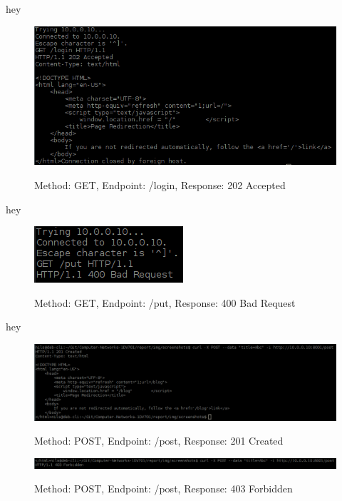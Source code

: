 \documentclass[a4paper,12pt]{article} %
\begin{document}
{hey 

\begin{figure}[H]
    \centering  
    \includegraphics[scale=0.6]{img/screenshots/response202login.png}
	\label{fig:response202login}
	\caption{Method: GET, Endpoint: /login, Response: 202 Accepted}
\end{figure}

hey 

\begin{figure}[H]
    \centering  
    \includegraphics[scale=1]{img/screenshots/response400put.png}
	\label{fig:response400put}
	\caption{Method: GET, Endpoint: /put, Response: 400 Bad Request}
\end{figure}

hey 

\begin{figure}[H]
    \centering  
    \includegraphics[scale=0.40]{img/screenshots/response201created.png}
	\label{fig:response201created}
	\caption{Method: POST, Endpoint: /post, Response: 201 Created}
\end{figure}


\begin{figure}[H]
    \centering  
    \includegraphics[scale=0.40]{img/screenshots/response403forbidden.png}
	\label{fig:response403forbidden}
	\caption{Method: POST, Endpoint: /post, Response: 403 Forbidden}
\end{figure}

}
\end{document}
